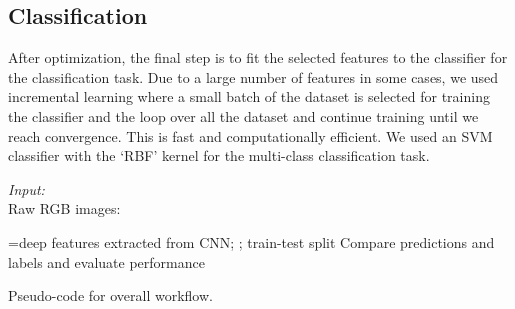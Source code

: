 \documentclass{llncs}
\begin{document}
\subsection{Classification}
After optimization, the final step is to fit the selected features to the classifier for the classification task. Due to a large number of features in some cases, we used incremental learning where a small batch of the dataset is selected for training the classifier and the loop over all the dataset and continue training until we reach convergence. This is fast and computationally efficient. We used an SVM classifier with the ‘RBF’ kernel for the multi-class classification task.
\begin{algorithm}
    {\em Input:}\\
    Raw RGB images: 
    \begin{algorithmic}
        \STATE =deep features extracted from  CNN; 
        \STATE ;  
        \STATE  {}
        \STATE  {}
        \STATE train-test split
        \STATE  {}
        \STATE  {}
        \STATE Compare predictions and labels and evaluate performance
    \end{algorithmic}
    \caption{Pseudo-code for overall workflow.}
    \label{algooverall}
\end{algorithm}
\end{document}
